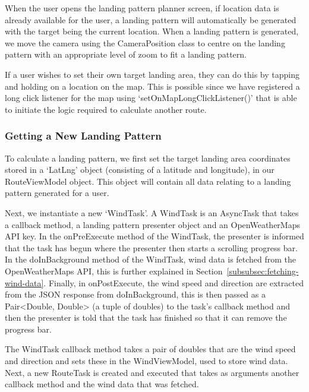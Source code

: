 When the user opens the landing pattern planner screen, if location data is already available for the user, a landing pattern will automatically be generated with the target being the current location. When a landing pattern is generated, we move the camera using the CameraPosition class to centre on the landing pattern with an appropriate level of zoom to fit a landing pattern.

If a user wishes to set their own target landing area, they can do this by tapping and holding on a location on the map. This is possible since we have registered a long click listener for the map using `setOnMapLongClickListener()' that is able to initiate the logic required to calculate another route.

\subsubsection{Getting a New Landing Pattern}
To calculate a landing pattern, we first set the target landing area coordinates stored in a `LatLng' object (consisting of a latitude and longitude), in our RouteViewModel object. This object will contain all data relating to a landing pattern generated for a user.

Next, we instantiate a new `WindTask'. A WindTask is an AsyncTask that takes a callback method, a landing pattern presenter object and an OpenWeatherMaps API key. In the onPreExecute method of the WindTask, the presenter is informed that the task has begun where the presenter then starts a scrolling progress bar. In the doInBackground method of the WindTask, wind data is fetched from the OpenWeatherMaps API, this is further explained in Section~\vref{subsubsec:fetching-wind-data}. Finally, in onPostExecute, the wind speed and direction are extracted from the JSON response from doInBackground, this is then passed as a Pair<Double, Double> (a tuple of doubles) to the task's callback method and then the presenter is told that the task has finished so that it can remove the progress bar.

The WindTask callback method takes a pair of doubles that are the wind speed and direction and sets these in the WindViewModel, used to store wind data. Next, a new RouteTask is created and executed that takes as arguments another callback method and the wind data that was fetched.

